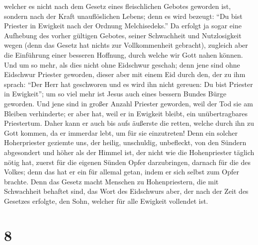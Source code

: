  welcher es nicht nach dem Gesetz eines fleischlichen
Gebotes geworden ist, sondern nach der Kraft unauflöslichen Lebens;
 denn es wird bezeugt: ``Du bist Priester in Ewigkeit
nach der Ordnung Melchisedeks.''  Da erfolgt ja sogar
eine Aufhebung des vorher gültigen Gebotes, seiner Schwachheit und
Nutzlosigkeit wegen  (denn das Gesetz hat nichts zur
Vollkommenheit gebracht), zugleich aber die Einführung einer besseren
Hoffnung, durch welche wir Gott nahen können.  Und um so
mehr, als dies nicht ohne Eidschwur geschah; denn jene sind ohne
Eidschwur Priester geworden,  dieser aber mit einem Eid
durch den, der zu ihm sprach: ``Der Herr hat geschworen und es wird ihn
nicht gereuen: Du bist Priester in Ewigkeit'';  um so
viel mehr ist Jesus auch eines bessern Bundes Bürge geworden.
 Und jene sind in großer Anzahl Priester geworden, weil
der Tod sie am Bleiben verhinderte;  er aber hat, weil er
in Ewigkeit bleibt, ein unübertragbares Priestertum. 
Daher kann er auch bis aufs äußerste die retten, welche durch ihn zu
Gott kommen, da er immerdar lebt, um für sie einzutreten!
 Denn ein solcher Hoherpriester geziemte uns, der heilig,
unschuldig, unbefleckt, von den Sündern abgesondert und höher als der
Himmel ist,  der nicht wie die Hohenpriester täglich
nötig hat, zuerst für die eigenen Sünden Opfer darzubringen, darnach für
die des Volkes; denn das hat er ein für allemal getan, indem er sich
selbst zum Opfer brachte.  Denn das Gesetz macht Menschen
zu Hohenpriestern, die mit Schwachheit behaftet sind, das Wort des
Eidschwurs aber, der nach der Zeit des Gesetzes erfolgte, den Sohn,
welcher für alle Ewigkeit vollendet ist.

\hypertarget{section-7}{%
\section{8}\label{section-7}}

